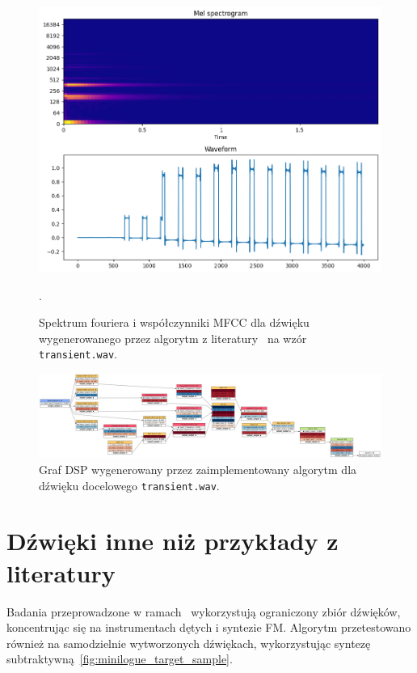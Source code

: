 \begin{multicols}{3}
\begin{figure}[H]
    \centering
    \includegraphics[width=0.9\linewidth]{rys06/macret_evolved_transient.png}
    \caption{
      Spektrum fouriera i współczynniki MFCC dla dźwięku wygenerowanego 
      przez algorytm z literatury~\cite{evolutionary_puredata} na wzór
      \texttt{transient.wav}.
    }\label{fig:evolved_literature_transient_sound_overview}.
\end{figure}
\end{multicols}

\begin{figure}
    \centering
    \includegraphics[angle=90,width=0.35\linewidth]{rys06/evolved_graph_transient.png}
    \caption{
      Graf DSP wygenerowany przez zaimplementowany algorytm
      dla dźwięku docelowego \texttt{transient.wav}.
    }\label{fig:evolved_graph_transient}
\end{figure}

\newpage
\section{Dźwięki inne niż przykłady z literatury}\label{sec:non_literature_samples}

Badania przeprowadzone w ramach~\cite{evolutionary_puredata}
wykorzystują ograniczony zbiór dźwięków, koncentrując
się na instrumentach dętych i syntezie FM\@. Algorytm przetestowano
również na samodzielnie wytworzonych dźwiękach, wykorzystując syntezę
subtraktywną~\ref{fig:minilogue_target_sample}.

